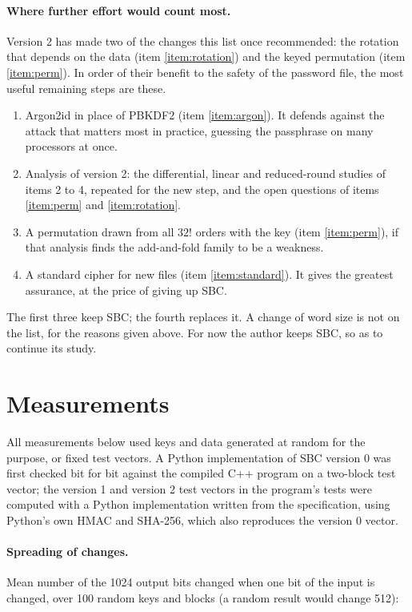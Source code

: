 \paragraph{Where further effort would count most.} Version 2 has made two of
the changes this list once recommended: the rotation that depends on the data
(item \ref{item:rotation}) and the keyed permutation (item \ref{item:perm}). In
order of their benefit to the safety of the password file, the most useful
remaining steps are these.
\begin{enumerate}[label=(\alph*)]
\item Argon2id in place of PBKDF2 (item \ref{item:argon}). It defends against
      the attack that matters most in practice, guessing the passphrase on
      many processors at once.
\item Analysis of version 2: the differential, linear and reduced-round
      studies of items 2 to 4, repeated for the new step, and the open
      questions of items \ref{item:perm} and \ref{item:rotation}.
\item A permutation drawn from all $32!$ orders with the key (item
      \ref{item:perm}), if that analysis finds the add-and-fold family to be a
      weakness.
\item A standard cipher for new files (item \ref{item:standard}). It gives
      the greatest assurance, at the price of giving up SBC.
\end{enumerate}
The first three keep SBC; the fourth replaces it. A change of word size is not
on the list, for the reasons given above. For now the author keeps SBC, so as to
continue its study.

\appendix

\section{Measurements}
\label{sec:measure}

All measurements below used keys and data generated at random for the purpose,
or fixed test vectors. A Python implementation of SBC version 0 was first
checked bit for bit against the compiled C++ program on a two-block test vector;
the version 1 and version 2 test vectors in the program's tests were computed
with a Python implementation written from the specification, using Python's own
HMAC and SHA-256, which also reproduces the version 0 vector.

\paragraph{Spreading of changes.} Mean number of the 1024 output bits changed
when one bit of the input is changed, over 100 random keys and blocks (a random
result would change 512):

